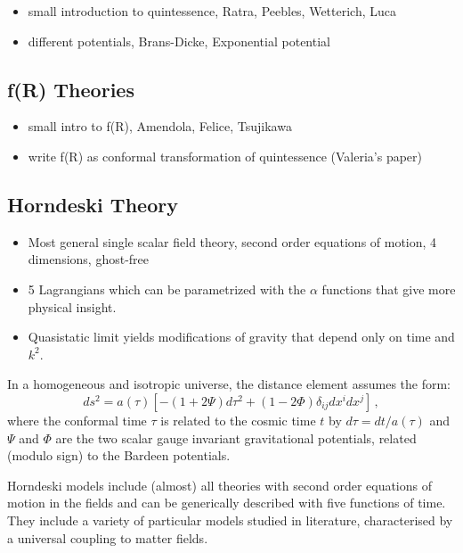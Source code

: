 \begin{itemize}
\item small introduction to quintessence, Ratra, Peebles, Wetterich, Luca
\item different potentials, Brans-Dicke, Exponential potential
\end{itemize}

\subsection{f(R) Theories}
\begin{itemize}
\item small intro to f(R), Amendola, Felice, Tsujikawa
\item write f(R) as conformal transformation of quintessence (Valeria's paper)
\end{itemize}

\subsection{Horndeski Theory}
\begin{itemize}
\item Most general single scalar field theory, second order equations of
motion, 4 dimensions, ghost-free
\item 5 Lagrangians which can be parametrized with the $\alpha$ functions
that give more physical insight.
\item Quasistatic limit yields modifications of gravity that depend only
on time and $k^{2}$.
\end{itemize}

In a homogeneous and isotropic universe, the distance element
assumes the form: 
\begin{equation}
ds^{2}=a(\tau)[-(1+2\Psi)d\tau^{2}+(1-2\Phi)\delta_{ij}dx^{i}dx^{j}]\,,
\end{equation}
where the conformal time $\tau$ is related to the cosmic time $t$
by $d\tau=d t/a(\tau)$ and $\Psi$ and $\Phi$ are the two scalar
gauge invariant gravitational potentials, related (modulo sign) to
the Bardeen potentials.

Horndeski models include (almost) all theories
with second order equations of motion in the fields and can be generically
described with five functions of time. They include a variety of particular
models studied in literature, characterised by a universal coupling
to matter fields.

